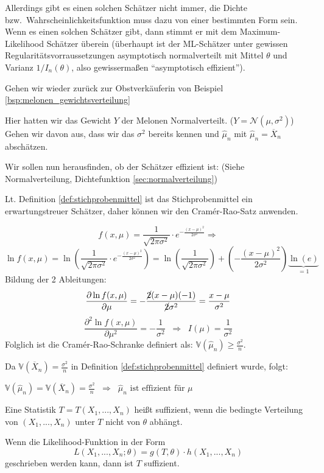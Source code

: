 Allerdings gibt es einen solchen Schätzer nicht immer, 
die Dichte bzw.\ Wahrscheinlichkeitsfunktion muss dazu von einer bestimmten
Form sein. Wenn es einen solchen Schätzer gibt, dann stimmt er mit
dem Maximum-Likelihood Schätzer überein (überhaupt ist der ML-Schätzer
unter gewissen Regularitätsvorraussetzungen asymptotisch normalverteilt
mit Mittel $\theta$ und Varianz $1/I_n(\theta)$, also gewissermaßen
``asymptotisch effizient'').

\begin{bsp}
Gehen wir wieder zurück zur Obstverkäuferin von Beispiel \ref{bsp:melonen_gewichtsverteilung}

Hier hatten wir das Gewicht $Y$ der Melonen Normalverteilt. ($Y=\mathcal N(\mu, \sigma^2)$)
Gehen wir davon aus, dass wir das $\sigma^2$ bereits kennen und $\hat\mu_n$ mit $\hat\mu_n=\overline X_n$ abschätzen.

Wir sollen nun herausfinden, ob der Schätzer effizient ist: (Siehe Normalverteilung, Dichtefunktion \ref{sec:normalverteilung})

Lt. Definition \ref{def:stichprobenmittel} ist das Stichprobenmittel ein erwartungstreuer Schätzer, daher können wir den Cramér-Rao-Satz anwenden.

\[f(x,\mu)=\frac{1}{\sqrt{2\pi\sigma^2}}\cdot e^{-\frac{(x-\mu)^2}{2\sigma^2}}\Rightarrow\]
\[\ln f(x,\mu)=\ln\left(\frac{1}{\sqrt{2\pi\sigma^2}}\cdot e^{-\frac{(x-\mu)^2}{2\sigma^2}}\right)=
\ln\left(\frac{1}{\sqrt{2\pi\sigma^2}}\right)+ \left(-\frac{(x-\mu)^2}{2\sigma^2}\right)\underbrace{\ln(e)}_{=1}
\]
Bildung der 2 Ableitungen:
\[\frac{\partial \ln f(x,\mu)}{\partial\mu}=-\frac{\cancel 2(x-\mu)(-1)}{\cancel 2\sigma^2}=\frac{x-\mu}{\sigma^2}\]
\[\frac{\partial^2 \ln f(x,\mu)}{\partial\mu^2}=-\frac{1}{\sigma^2}\;\;\Rightarrow\;\;I(\mu)=\frac{1}{\sigma^2}\]
Folglich ist die Cramér-Rao-Schranke definiert als: $\mathbb{V}(\hat\mu_n)\geq \frac{\sigma^2}{n}$.

Da $\mathbb V(\overline X_n)=\frac{\sigma^2}{n}$ in Definition \ref{def:stichprobenmittel} definiert wurde, folgt:

$\mathbb V(\hat\mu_n)=\mathbb V(\overline X_n)=\frac{\sigma^2}{n}\;\;\Rightarrow\;\;\hat\mu_n\text{ ist effizient für }\mu$ 
\end{bsp}

\begin{definition}
Eine Statistik $T=T(X_1,...,X_n)$ heißt suffizient, wenn die bedingte Verteilung von $(X_1,..., X_n)$ unter $T$ nicht von $\theta$ abhängt.

Wenn die Likelihood-Funktion in der Form 
\[L(X_1,...,X_n;\theta)=g(T,\theta)\cdot h(X_1,...,X_n)\]
geschrieben werden kann, dann ist $T$ suffizient.
\end{definition}


